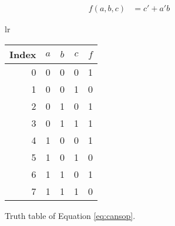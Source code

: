 \documentclass[12pt]{article}
\begin{document}
\begin{align}
f(a, b, c) &= c' + a'b \label{eq:simp}
\end{align}

\begin{figure}[!hbt]
\begin{center}

\begin{tabular}{lr}
  \begin{tabular}[t]{r|ccc|c}
Index&$a$&$b$&$c$&$f$\\
\hline
0 &0&0&0 &1\\
1 &0&0&1 &0\\
2 &0&1&0 &1\\
3 &0&1&1 &1\\
4 &1&0&0 &1\\
5 &1&0&1 &0\\
6 &1&1&0 &1\\
7 &1&1&1 &0\\
  \end{tabular}
\end{tabular}
\end{center}

\caption{Truth table of Equation \ref{eq:cansop}.}
\label{fig:tt}
\end{figure}
\end{document}
